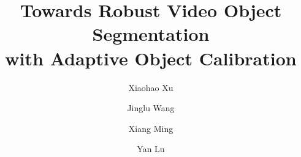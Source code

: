\documentclass[sigconf]{acmart}
\begin{document}
\newcommand{\todo}[1]{\textcolor{orange}{(@TODO: #1)}}
\newcommand{\del}[1]{\sout{\textcolor{purple}{#1}}}
\newcommand{\note}[1]{\textcolor{orange}{#1}}
\newcommand{\rev}[1]{\textcolor{purple}{#1}}
\newcommand{\highlight}[1]{\textit{\textbf{#1}}}
\newcommand{\fig}[1]{Fig.~#1}

\title[Towards Robust Video Object Segmentation with Adaptive Object Calibration]{Towards Robust Video Object Segmentation \\with Adaptive Object Calibration}











\author{Xiaohao Xu}
\author{Jinglu Wang}
\author{Xiang Ming}
\author{Yan Lu}













\renewcommand{\shortauthors}{Xu et al.}
\end{document}
